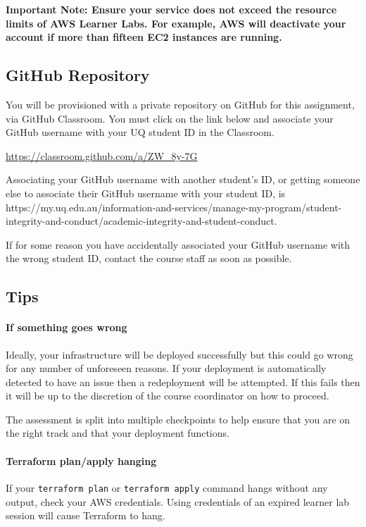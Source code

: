 \documentclass{csse4400}
\begin{document}
\noindent
\textbf{Important Note: Ensure your service does not exceed the resource limits of AWS Learner Labs. For example, AWS will deactivate your account if more than fifteen EC2 instances are running.}

\subsection{GitHub Repository}\label{sec:github}
You will be provisioned with a private repository on GitHub for this assignment, via GitHub Classroom. You must click on the link below and associate your GitHub username with your UQ student ID in the Classroom.

\url{https://classroom.github.com/a/ZW_8y-7G}

\noindent
Associating your GitHub username with another student's ID, or getting someone else to associate their GitHub username with your student ID, is  {https://my.uq.edu.au/information-and-services/manage-my-program/student-integrity-and-conduct/academic-integrity-and-student-conduct}.

If for some reason you have accidentally associated your GitHub username with the wrong student ID, contact the course staff as soon as possible.

\subsection{Tips}

\paragraph{If something goes wrong}
Ideally, your infrastructure will be deployed successfully but this could go wrong for any number of unforeseen reasons. If your deployment is automatically detected to have an issue then a redeployment will be attempted. If this fails then it will be up to the discretion of the course coordinator on how to proceed.

The assessment is split into multiple checkpoints to help ensure that you are on the right track and that your deployment functions.

\paragraph{Terraform plan/apply hanging}
If your \texttt{terraform plan} or \texttt{terraform apply} command hangs without any output, check your AWS credentials. Using credentials of an expired learner lab session will cause Terraform to hang.
\end{document}
